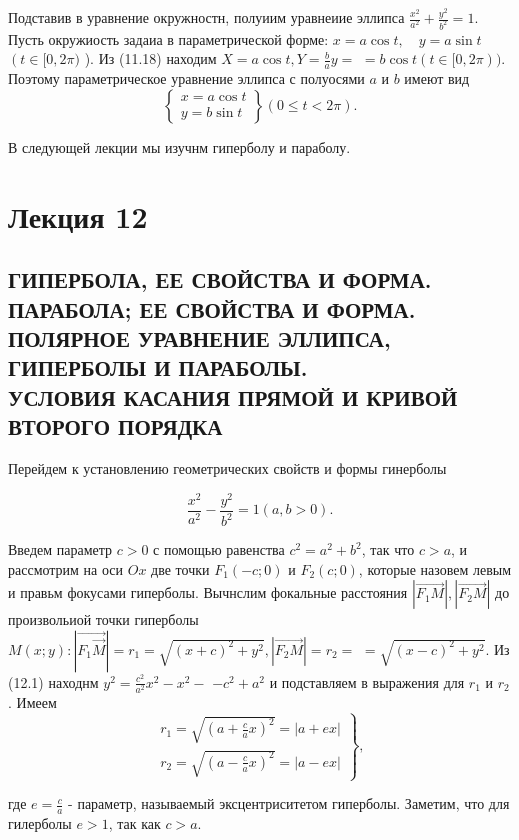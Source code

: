 \documentclass[10pt]{article}
\begin{document}
Подставив в уравнение окружностн, полуиим уравнеиие эллипса $\frac{x^2}{a^2}+\frac{y^2}{b^2}=1$. Пусть окружиость задаиа в параметрической форме: $x=a \cos t, \quad y=a \sin t$ $\left(t \in[0,2 \pi)\right.$ ). Из (11.18) находим $X=a \cos t, Y=\frac{b}{a} y=$ $=b \cos t(t \in[0,2 \pi))$. Поэтому параметрическое уравнение эллипса с полуосями $a$ и $b$ имеют вид
\[
\left\{\begin{array}{l}
x=a \cos t \\
y=b \sin t
\end{array}\right\}(0 \leqslant t<2 \pi) .\tag{11.19}\label{myeq}
\]


В следующей лекции мы изучнм гиперболу и параболу.
\section*{Лекция 12}
\subsection{ГИПЕРБОЛА, ЕЕ СВОЙСТВА И ФОРМА.\\ПАРАБОЛА; ЕЕ СВОЙСТВА И ФОРМА.\\ПОЛЯРНОЕ УРАВНЕНИЕ ЭЛЛИПСА, ГИПЕРБОЛЫ И ПАРАБОЛЫ.\\УСЛОВИЯ КАСАНИЯ ПРЯМОЙ И КРИВОЙ ВТОРОГО ПОРЯДКА}
Перейдем к установлению геометрических свойств и формы гинерболы

\[
\frac{x^2}{a^2}-\frac{y^2}{b^2}=1(a, b>0) .\tag{12.1}\label{myeq}
\]


Введем параметр $c>0$ с помощью равенства $c^2=a^2+b^2$, так что $c>a$, и рассмотрим на оси $O x$ две точки $F_1(-c ; 0)$ и $F_2(c ; 0)$, которые назовем левым и правьм фокусами гиперболы. Вычнслим фокальные расстояния $\left|\overrightarrow{F_1 M}\right|,\left|\overrightarrow{F_2 M}\right|$ до произвольиой точки гиперболы $M(x ; y):\left|\overrightarrow{F_1 \vec{M}}\right|=r_1=\sqrt{(x+c)^2+y^2},\left|\overrightarrow{F_2 M}\right|=r_2=$ $=\sqrt{(x-c)^2+y^2}$. Из (12.1) находнм $y^2=\frac{c^2}{a^2} x^2-x^2-$ $-c^2+a^2$ и подставляем в выражения для $r_1$ и $r_2$. Имеем
\newpage
\[
\left.\begin{array}{l}
r_1=\sqrt{\left(a+\frac{c}{a} x\right)^2}=|a+e x| \\
r_2=\sqrt{\left(a-\frac{c}{a} x\right)^2}=|a-e x|
\end{array}\right\},\tag{12.2}\label{myeq}
\]

где $e=\frac{c}{a}$ - параметр, называемый эксцентриситетом гиперболы. Заметим, что для гилерболы $e>1$, так как $c>a$.
\end{document}
